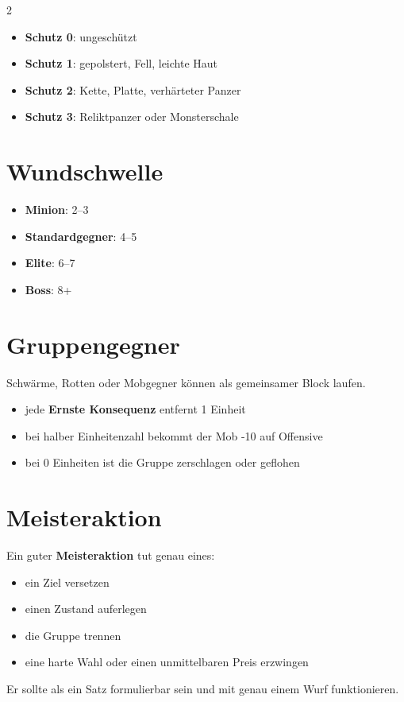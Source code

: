 \begin{multicols*}{2}
\begin{itemize}[leftmargin=*]
\item \textbf{Schutz 0}: ungeschützt
\item \textbf{Schutz 1}: gepolstert, Fell, leichte Haut
\item \textbf{Schutz 2}: Kette, Platte, verhärteter Panzer
\item \textbf{Schutz 3}: Reliktpanzer oder Monsterschale
\end{itemize}

\section{Wundschwelle}
\begin{itemize}[leftmargin=*]
\item \textbf{Minion}: 2--3
\item \textbf{Standardgegner}: 4--5
\item \textbf{Elite}: 6--7
\item \textbf{Boss}: 8+
\end{itemize}

\section{Gruppengegner}
Schwärme, Rotten oder Mobgegner können als gemeinsamer Block laufen.
\begin{itemize}[leftmargin=*]
\item jede \textbf{Ernste Konsequenz} entfernt 1 Einheit
\item bei halber Einheitenzahl bekommt der Mob -10 auf Offensive
\item bei 0 Einheiten ist die Gruppe zerschlagen oder geflohen
\end{itemize}

\section{Meisteraktion}
Ein guter \textbf{Meisteraktion} tut genau eines:
\begin{itemize}[leftmargin=*]
\item ein Ziel versetzen
\item einen Zustand auferlegen
\item die Gruppe trennen
\item eine harte Wahl oder einen unmittelbaren Preis erzwingen
\end{itemize}

Er sollte als ein Satz formulierbar sein und mit genau einem Wurf funktionieren.


\end{multicols*}
